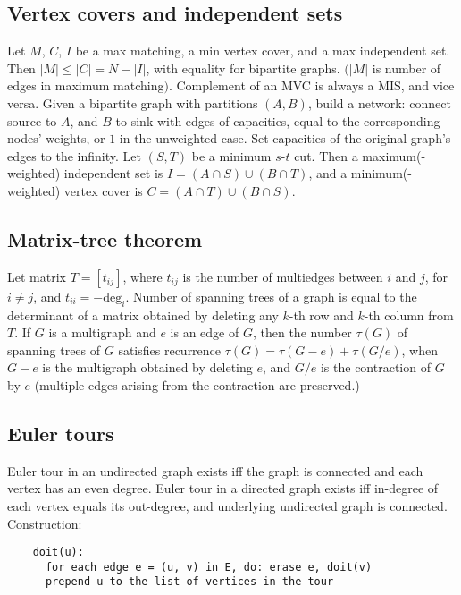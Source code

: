 \documentclass[12pt]{extarticle}
\begin{document}
\begin{multicols*}{2}
\subsection{Vertex covers and independent sets}
Let $M$, $C$, $I$ be a max matching, a min vertex cover, and a max independent set.
Then $|M| \le |C| = N - |I|$, with equality for bipartite graphs.
$(|M|$ is number of edges in maximum matching$)$.
Complement of an MVC is always a MIS, and vice versa.
Given a bipartite graph with partitions $(A, B)$, build a network:
connect source to $A$, and $B$ to sink with edges of capacities, equal to
the corresponding nodes' weights, or $1$ in the unweighted case.
Set capacities of the original graph's edges to the infinity.
Let $(S,T)$ be a minimum $s$-$t$ cut.
Then a maximum(-weighted) independent set is $I = (A \cap S) \cup (B \cap T)$,
and a minimum(-weighted) vertex cover is $C = (A \cap T) \cup (B \cap S)$.

\subsection{Matrix-tree theorem}
Let matrix $T = [t_{ij}]$, where $t_{ij}$ is the number of multiedges
between $i$ and $j$, for $i \ne j$, and $t_{ii} = -\mbox{deg}_i$.
Number of spanning trees of a graph is equal to the determinant of
a matrix obtained by deleting any $k$-th row and $k$-th column from $T$.
If $G$ is a multigraph and $e$ is an edge of $G$, then the number $\tau(G)$ of
spanning trees of $G$ satisfies recurrence $\tau(G) = \tau(G-e) + \tau(G/e)$,
when $G-e$ is the multigraph obtained by deleting $e$, and $G/e$ is
the contraction of $G$ by $e$ (multiple edges arising from the contraction
are preserved.)

\subsection{Euler tours}
Euler tour in an undirected graph exists iff the graph is connected and each
vertex has an even degree.  Euler tour in a directed graph exists iff in-degree
of each vertex equals its out-degree, and underlying undirected graph is connected.
Construction:
\vspace{-5mm}
\begin{verbatim}
    doit(u):
      for each edge e = (u, v) in E, do: erase e, doit(v)
      prepend u to the list of vertices in the tour
\end{verbatim}
\vspace{-2mm}



\end{multicols*}
\end{document}

